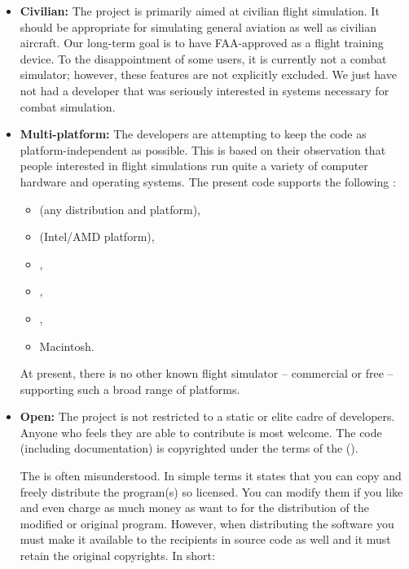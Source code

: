 \begin{itemize}
 \item \textbf{Civilian:} The project is primarily aimed
 at civilian flight simulation.  It should be appropriate for simulating general aviation
 as well as civilian aircraft.  Our long-term goal is to have \FlightGear{} FAA-approved as
 a flight training device.  To the disappointment of some users, it is currently not a
 combat simulator; however, these features are not explicitly excluded.  We just have
 not had a developer that was seriously interested in systems necessary for combat
 simulation.

 \item\textbf{Multi-platform:} The
 developers are attempting to keep the code as platform-independent as possible. This
 is based on their observation that people interested in flight simulations run quite a
 variety of computer hardware and operating systems. The present code supports the
 following :
  \begin{itemize}
  \item{} (any distribution and platform),
  \item{} (Intel/AMD platform),
  \item{},
  \item{},
  \item{},
  \item{Macintosh.}
  \end{itemize}

At present, there is no other known flight simulator -- commercial or free
-- supporting such a broad range of platforms.

  \item\textbf{Open:} The project is not restricted to a
  static or elite cadre of developers. Anyone who feels they are able to contribute
  is most welcome.  The code (including documentation) is copyrighted under the
  terms of the  ().

  The  is often misunderstood. In simple terms it states that you
  can copy and freely distribute the program(s) so licensed.  You can modify
  them if you like and even charge as much money as want to for the
  distribution of the modified or original program.  However, when
  distributing the software you must make it available to the recipients in
  source code as well and it must retain the original copyrights.
  In short:
\medskip


\end{itemize}
